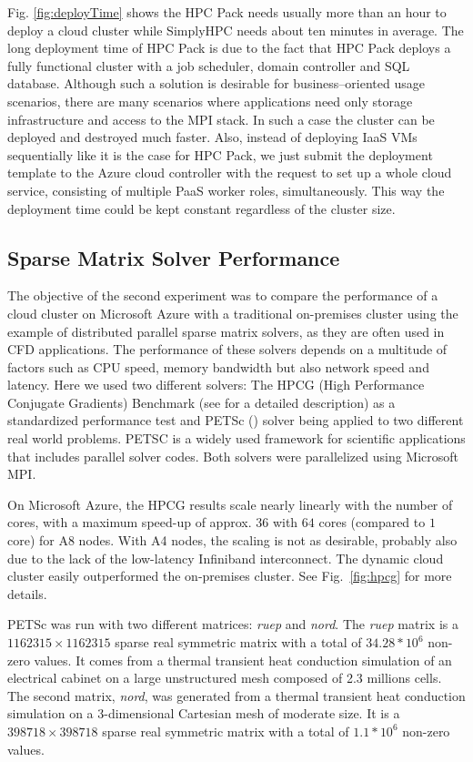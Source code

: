 \documentclass[3p,times]{elsarticle}
\begin{document}
Fig. \ref{fig:deployTime} shows the HPC Pack needs usually more than an hour to deploy a cloud cluster while SimplyHPC needs about ten minutes in average. The long deployment time of HPC Pack is due to the fact that HPC Pack deploys a fully functional cluster with a job scheduler, domain controller and SQL database. Although such a solution is desirable for business--oriented usage scenarios, there are many scenarios where applications need only storage infrastructure and access to the MPI stack. In such a case the cluster can be deployed and destroyed much faster. Also, instead of deploying IaaS VMs sequentially like it is the case for HPC Pack, we just submit the deployment template to the Azure cloud controller with the request to set up a whole cloud service, consisting of multiple PaaS worker roles, simultaneously. This way the deployment time could be kept constant regardless of the cluster size.

\subsection{Sparse Matrix Solver Performance}
The objective of the second experiment was to compare the performance of a cloud cluster on Microsoft Azure with a traditional on-premises cluster using the example of distributed parallel sparse matrix solvers, as they are often used in CFD applications. The performance of these solvers depends on a multitude of factors such as CPU speed, memory bandwidth but also network speed and latency. Here we used two different solvers: The HPCG (High Performance Conjugate Gradients) Benchmark (see \cite{hpcg} for a detailed description) as a standardized performance test and PETSc (\cite{petsc-web-page}) solver being applied to two different real world problems. PETSC is a widely used framework for scientific applications that includes parallel solver codes. Both solvers were parallelized using Microsoft MPI.

On Microsoft Azure, the HPCG results scale nearly linearly with the number of cores, with a maximum speed-up of approx. $36$ with $64$ cores (compared to $1$ core) for A8 nodes. With A4 nodes, the scaling is not as desirable, probably also due to the lack of the low-latency Infiniband interconnect. The dynamic cloud cluster easily outperformed the on-premises cluster. See Fig.~\ref{fig:hpcg} for more details.

PETSc was run with two different matrices: \textit{ruep} and \textit{nord}. The \textit{ruep} matrix is a $1162315 \times 1162315$ sparse real symmetric matrix with a total of $34.28*10^{6}$ non-zero values. It comes from a thermal transient heat conduction simulation of an electrical cabinet on a large unstructured mesh composed of 2.3 millions cells. The second matrix, \textit{nord}, was generated from a thermal transient heat conduction simulation on a 3-dimensional Cartesian mesh of moderate size. It is a $398718 \times 398718$ sparse real symmetric matrix with a total of $1.1*10^{6}$ non-zero values.
\end{document}
